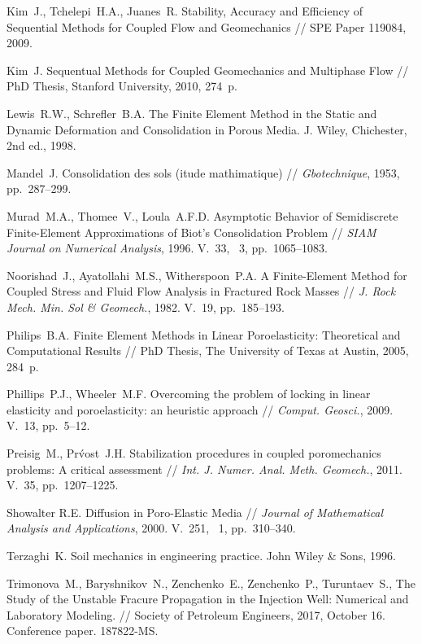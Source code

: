 \begin{thebibliography}{1000}
Kim~J., Tchelepi~H.A., Juanes~R. Stability, Accuracy and Efficiency of Sequential Methods
for Coupled Flow and Geomechanics // SPE Paper 119084, 2009. 

Kim~J. Sequentual Methods for Coupled Geomechanics and Multiphase Flow //
PhD Thesis, Stanford University, 2010, 274~p.

Lewis~R.W., Schrefler~B.A. The Finite Element
Method in the Static and Dynamic Deformation and Consolidation in
Porous Media. J. Wiley, Chichester, 2nd ed., 1998.

Mandel~J. Consolidation des sols (itude mathimatique) // \emph{Gbotechnique}, 1953, pp.~287--299.

Murad~M.A., Thomee~V., Loula~A.F.D.
Asymptotic Behavior of Semidiscrete Finite-Element Approximations of Biot's Consolidation
Problem // \emph{SIAM Journal on Numerical Analysis}, 1996.
V.~33, \No~3, pp.~1065--1083.

Noorishad~J., Ayatollahi~M.S., Witherspoon~P.A.
A Finite-Element Method for Coupled
Stress and Fluid Flow Analysis in
Fractured Rock Masses // \emph{J. Rock Mech. Min. Sol \& Geomech.}, 1982.
V.~19, pp.~185--193.

Philips~B.A.
Finite Element Methods in Linear Poroelasticity:
Theoretical and Computational Results // PhD Thesis, The University of Texas at Austin, 2005, 284~p.

Phillips~P.J., Wheeler~M.F.
Overcoming the problem of locking in linear elasticity
and poroelasticity: an heuristic approach // \emph{Comput. Geosci.}, 2009.
V.~13, pp.~5--12.

Preisig~M., Pr\'vost~J.H.
Stabilization procedures in coupled poromechanics problems:
A critical assessment // \emph{Int. J. Numer. Anal. Meth. Geomech.}, 2011.
V.~35, pp.~1207--1225.

Showalter R.E.
Diffusion in Poro-Elastic Media // \emph{Journal of Mathematical Analysis and Applications}, 2000.
V.~251, \No~1, pp.~310--340.

Terzaghi~K. Soil mechanics in engineering practice. John Wiley \& Sons, 1996.

Trimonova~M., Baryshnikov~N., Zenchenko~E., Zenchenko~P., Turuntaev~S., 
The Study of the Unstable Fracure Propagation in the Injection Well: Numerical and Laboratory Modeling. // 
Society of Petroleum Engineers, 2017, October 16. 
Conference paper. 187822-MS. 


\end{thebibliography}
